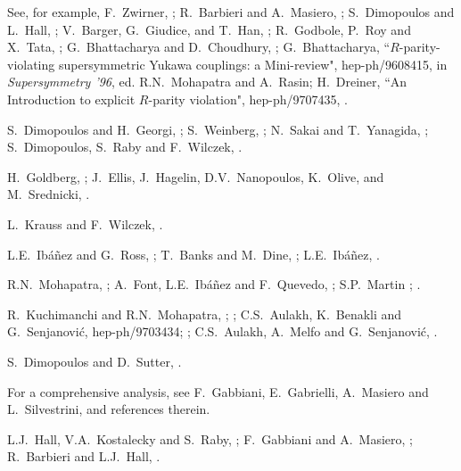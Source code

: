 \begin{thebibliography}{99}
See, for example,
F.~Zwirner, ;
R.~Barbieri and A.~Masiero, ;
S.~Dimopoulos and L.~Hall, ;
V.~Barger, G.~Giudice, and T.~Han, ;
R.~Godbole, P.~Roy and X.~Tata, ;
G.~Bhattacharya and D.~Choudhury, ;
G.~Bhattacharya, ``$R$-parity-violating supersymmetric
Yukawa couplings: a Mini-review", hep-ph/9608415,  in {\em Supersymmetry
'96}, ed. R.N.~Mohapatra and A.~Rasin;
H.~Dreiner, ``An Introduction to explicit $R$-parity violation",
hep-ph/9707435,
\perspectives.

 S.~Dimopoulos and H.~Georgi,
;
S.~Weinberg, ;
N.~Sakai and T.~Yanagida, ;
S.~Dimopoulos, S.~Raby and F.~Wilczek, .

H.~Goldberg, ;
J.~Ellis, J.~Hagelin, D.V.~Nanopoulos, K.~Olive, and M.~Srednicki,
.

L.~Krauss and F.~Wilczek, .

 L.E.~Ib\'a\~nez and G.~Ross,
;
T.~Banks and M.~Dine, ;
L.E.~Ib\'a\~nez, .

R.N.~Mohapatra, ;
A.~Font, L.E.~Ib\'a\~nez and F.~Quevedo,
;
S.P.~Martin
; .

R.~Kuchimanchi and R.N.~Mohapatra, ;
;
C.S.~Aulakh, K.~Benakli and G.~Senjanovi\'c, hep-ph/9703434;
;
C.S.~Aulakh, A.~Melfo and G.~Senjanovi\'c, .

 S.~Dimopoulos and D.~Sutter,
.

 For a comprehensive analysis, see F.~Gabbiani,
E.~Gabrielli,
A.~Masiero and L.~Silvestrini, 
and references therein.

 L.J.~Hall, V.A.~Kostalecky and S.~Raby,
; F.~Gabbiani and A.~Masiero,
; R.~Barbieri and L.J.~Hall,
.


\end{thebibliography}
